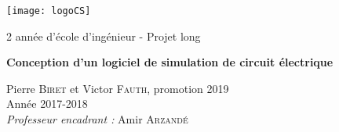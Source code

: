 \begin{titlepage}
\begin{center}

\texttt{[image: logoCS]}~\\[1cm]

\vspace{0.5cm}

{\LARGE 2\ieme{} année d'école d'ingénieur - Projet long\\[0.4cm] }

{\Huge \bfseries Conception d'un logiciel de simulation de circuit électrique \\[0.4cm] }

\vspace{1.5cm}

\huge Pierre \textsc{Biret} et Victor \textsc{Fauth}, promotion 2019 \\[2cm]

\LARGE Année 2017-2018 \\[2cm]

\textit{Professeur encadrant :} Amir \textsc{Arzandé}


\end{center}
\end{titlepage}